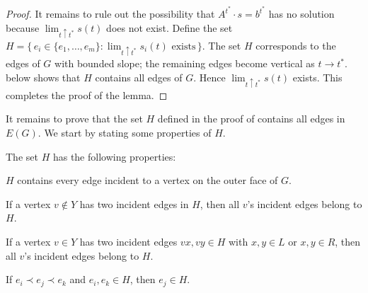 \begin{proof}
	It remains to rule out the possibility that
	$A^{t^*}\cdot s=b^{t^*}$ has no solution because
	$\lim_{t\uparrow t^*} s(t)$ does not exist.  Define the set $H=\{\,e_i\in
	\{e_1,\ldots,e_m\}:\text{$\lim_{t\uparrow t^*} s_i(t)$ exists}\,\}$.
	The set $H$ corresponds to the edges of $G$
	with bounded slope; the remaining edges become vertical as $t\to t^*$.
	 below shows that $H$ contains all edges of $G$. Hence $\lim_{t\uparrow t^*} s(t)$ exists. This completes the proof of the lemma.
\end{proof}


It remains to prove that the set $H$ defined in the proof of  contains all edges in $E(G)$. We start by stating some properties of $H$.

	\begin{prop}
		The set   $H$ has the following properties: 
		\begin{compactenum}[(PR1)]
			\item $H$ contains every edge incident to a vertex on the outer face of $G$.
			\item \label{off-C}
			If a vertex $v\not\in Y$ has two incident edges in
			$H$,
			then all $v$'s incident edges belong to $H$.
			\item \label{on-C}
			If a vertex $v\in Y$ has two incident edges $vx,vy\in H$ with $x,y\in L$ or $x,y\in R$, then all $v$'s incident edges belong to $H$.
			\item If $e_i \prec e_j \prec e_k$ and $e_i,e_k\in H$, 
			then $e_j\in H$.
		\end{compactenum}
	\end{prop}
		
